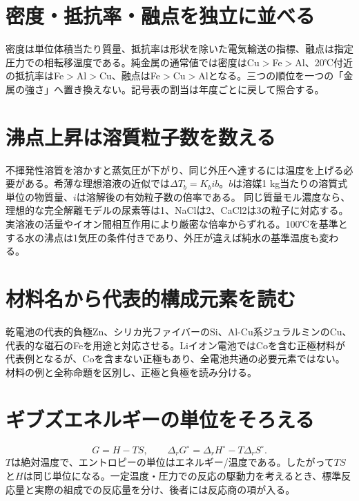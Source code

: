 \section{密度・抵抗率・融点を独立に並べる}
\label{theory:basicchem:properties}
密度は単位体積当たり質量、抵抗率は形状を除いた電気輸送の指標、融点は指定圧力での相転移温度である。純金属の通常値では密度はCu\(>\)Fe\(>\)Al、20℃付近の抵抗率はFe\(>\)Al\(>\)Cu、融点はFe\(>\)Cu\(>\)Alとなる\autocite{openstax_resistivity,chem55_properties,chem55_properties_al,chem55_properties_fe}。三つの順位を一つの「金属の強さ」へ置き換えない。記号表の割当は年度ごとに戻して照合する。

\section{沸点上昇は溶質粒子数を数える}
\label{theory:basicchem:colligative}
不揮発性溶質を溶かすと蒸気圧が下がり、同じ外圧へ達するには温度を上げる必要がある。希薄な理想溶液の近似では\(\Delta T_b=K_b i b\)。\(b\)は溶媒1 kg当たりの溶質式単位の物質量、\(i\)は溶解後の有効粒子数の倍率である\autocite{chem55_colligative}。
同じ質量モル濃度なら、理想的な完全解離モデルの尿素等は1、NaClは2、CaCl2は3の粒子に対応する。実溶液の活量やイオン間相互作用により厳密な倍率からずれる。100℃を基準とする水の沸点は1気圧の条件付きであり、外圧が違えば純水の基準温度も変わる。

\section{材料名から代表的構成元素を読む}
\label{theory:basicchem:elements}
乾電池の代表的負極Zn、シリカ光ファイバーのSi、Al-Cu系ジュラルミンのCu、代表的な磁石のFeを用途と対応させる\autocite{chem55_fiber,chem55_duralumin,openstax_magnetism}。Liイオン電池ではCoを含む正極材料が代表例となるが、Coを含まない正極もあり、全電池共通の必要元素ではない\autocite{openstax_batteries}。材料の例と全称命題を区別し、正極と負極を読み分ける。

\section{ギブズエネルギーの単位をそろえる}
\label{theory:basicchem:gibbs}
\begin{equation}G=H-TS,\qquad\Delta_rG^\circ=\Delta_rH^\circ-T\Delta_rS^\circ.\end{equation}
\(T\)は絶対温度で、エントロピーの単位はエネルギー/温度である。したがって\(TS\)と\(H\)は同じ単位になる\autocite{chem55_gibbs}。一定温度・圧力での反応の駆動力を考えるとき、標準反応量と実際の組成での反応量を分け、後者には反応商の項が入る。

